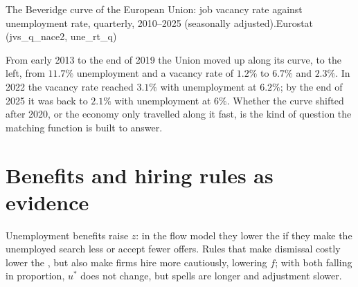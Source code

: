 \begin{omchart}{The Beveridge curve of the European Union: job vacancy rate
against unemployment rate, quarterly, 2010--2025 (seasonally adjusted).}{Eurostat
(jvs\_q\_nace2, une\_rt\_q)}
\end{omchart}

From early 2013 to the end of 2019 the Union moved up along its curve, to
the left,
from $11.7\%$ unemployment and a vacancy rate of $1.2\%$ to $6.7\%$ and $2.3\%$.
In 2022 the vacancy rate reached $3.1\%$ with unemployment at $6.2\%$; by the end
of 2025 it was back to $2.1\%$ with unemployment at $6\%$. %
Whether the curve shifted after 2020, or the economy only travelled along
it fast, is the kind of question the matching function is built to answer.

\section{Benefits and hiring rules as evidence}\label{sec:b1:unemployment-flows:benefits}

Unemployment benefits raise $z$: in the flow model they lower the  if they make the unemployed search less or accept fewer offers. Rules
that make dismissal costly lower the , but also make firms
hire more cautiously, lowering $f$; with both falling in proportion, $u^*$ does
not change, but spells are longer and adjustment slower.

